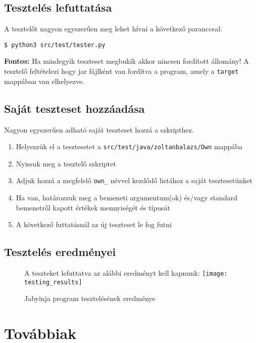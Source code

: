 \subsection{Tesztelés lefuttatása}

A tesztelőt nagyon egyszerűen meg lehet hívni a következő paranccsal:
\begin{verbatim}
$ python3 src/test/tester.py
\end{verbatim}

\textbf{Fontos:} Ha mindegyik teszteset megbukik akkor nincsen fordított állomány! A tesztelő feltételezi hogy jar fájlként van fordítva a program, amely a \lstinline{target} mappában van elhelyezve.

\subsection{Saját teszteset hozzáadása}

Nagyon egyszerűen adható saját teszteset hozzá a szkripthez.
\begin{enumerate}
	\item Helyezzük el a tesztesetet a \lstinline{src/test/java/zoltanbalazs/Own} mappába
	\item Nyissuk meg a tesztelő szkriptet
	\item Adjuk hozzá a megfelelő \lstinline{own_} névvel kezdődő listához a saját tesztesetünket
	\item Ha van, határozzuk meg a bemeneti argumentum(ok) és/vagy standard bemenetről kapott értékek mennyiségét és típusát
	\item A következő futtatásnál az új teszteset le fog futni
\end{enumerate}

\subsection{Tesztelés eredményei}

\begin{figure}[H]
	A teszteket lefuttatva az alábbi eredményt kell kapnunk:
	\centering
	\texttt{[image: testing\_results]}
	\caption{Jabyinja program tesztelésének eredménye}
	\label{fig:testing}
\end{figure}

\section{Továbbiak}

